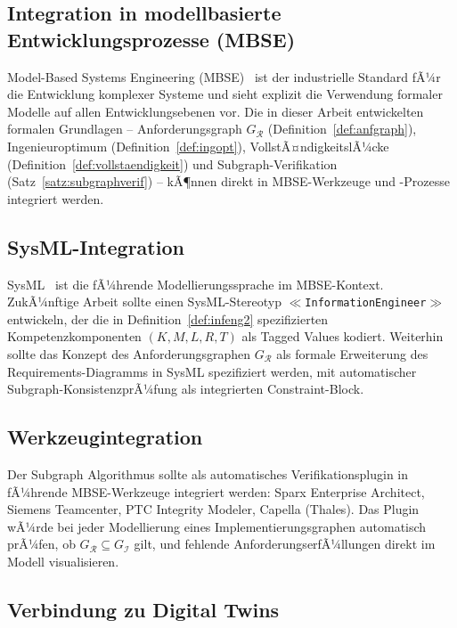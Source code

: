﻿\documentclass[a4paper,12pt]{report}
\theoremstyle{definition}
\begin{document}
\subsection{Integration in modellbasierte Entwicklungsprozesse (MBSE)}

Model-Based Systems Engineering (MBSE)~\cite{friedenthal2011} ist der industrielle
Standard fÃ¼r die Entwicklung komplexer Systeme und sieht explizit die Verwendung
formaler Modelle auf allen Entwicklungsebenen vor. Die in dieser Arbeit entwickelten
formalen Grundlagen -- Anforderungsgraph $G_\mathcal{R}$ (Definition~\ref{def:anfgraph}),
Ingenieuroptimum (Definition~\ref{def:ingopt}), VollstÃ¤ndigkeitslÃ¼cke
(Definition~\ref{def:vollstaendigkeit}) und Subgraph-Verifikation
(Satz~\ref{satz:subgraphverif}) -- kÃ¶nnen direkt in MBSE-Werkzeuge und -Prozesse
integriert werden.

\subsection{SysML-Integration}

SysML~\cite{sysml2019} ist die fÃ¼hrende Modellierungssprache im MBSE-Kontext.
ZukÃ¼nftige Arbeit sollte einen SysML-Stereotyp \texttt{$\ll$InformationEngineer$\gg$}
entwickeln, der die in Definition~\ref{def:infeng2} spezifizierten Kompetenzkomponenten
$(K, M, L, R, T)$ als Tagged Values kodiert. Weiterhin sollte das Konzept des
Anforderungsgraphen $G_\mathcal{R}$ als formale Erweiterung des Requirements-Diagramms
in SysML spezifiziert werden, mit automatischer Subgraph-KonsistenzprÃ¼fung als
integrierten Constraint-Block.

\subsection{Werkzeugintegration}

Der Subgraph Algorithmus sollte als automatisches Verifikationsplugin in fÃ¼hrende
MBSE-Werkzeuge integriert werden: Sparx Enterprise Architect, Siemens Teamcenter,
PTC Integrity Modeler, Capella (Thales). Das Plugin wÃ¼rde bei jeder Modellierung
eines Implementierungsgraphen automatisch prÃ¼fen, ob $G_\mathcal{R} \subseteq G_\mathcal{I}$
gilt, und fehlende AnforderungserfÃ¼llungen direkt im Modell visualisieren.

\subsection{Verbindung zu Digital Twins}
\end{document}
